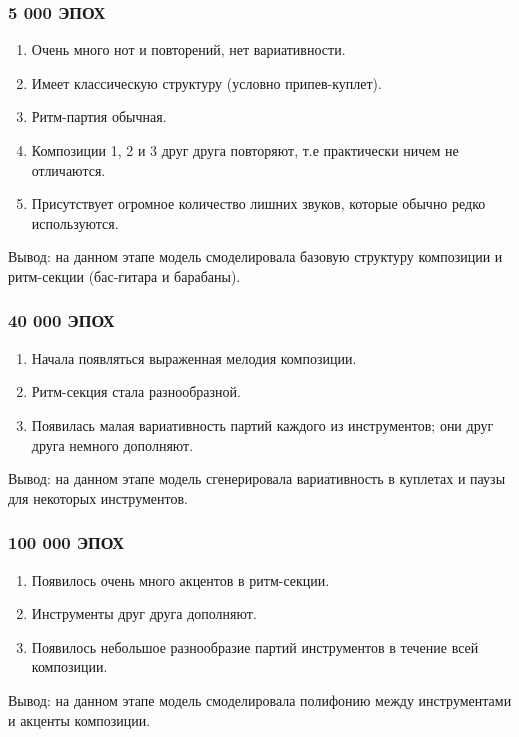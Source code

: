 \subsubsection{5 000 ЭПОХ}
\begin{enumerate}
    \item Очень много нот и повторений, нет вариативности.
    \item Имеет классическую структуру (условно припев-куплет).
    \item Ритм-партия обычная.
    \item Композиции 1, 2 и 3 друг друга повторяют, т.е практически ничем не отличаются.
    \item Присутствует огромное количество лишних звуков, которые обычно редко используются.
\end{enumerate}

Вывод: на данном этапе модель смоделировала базовую структуру композиции и ритм-секции (бас-гитара и барабаны).

\subsubsection{40 000 ЭПОХ}
\begin{enumerate}
    \item Начала появляться выраженная мелодия композиции.
    \item Ритм-секция стала разнообразной.
    \item Появилась малая вариативность партий каждого из инструментов; они друг друга немного дополняют.
\end{enumerate}

Вывод: на данном этапе модель сгенерировала вариативность в куплетах и паузы для некоторых инструментов.

\subsubsection{100 000 ЭПОХ}
\begin{enumerate}
    \item Появилось очень много акцентов в ритм-секции.
    \item Инструменты друг друга дополняют.
    \item Появилось небольшое разнообразие партий инструментов в течение всей композиции.
\end{enumerate}

Вывод: на данном этапе модель смоделировала полифонию между инструментами и акценты композиции.

